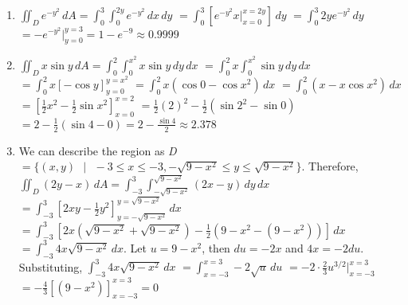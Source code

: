 \begin{Answer}[ref = non-rect]
\begin{enumerate}
    \item $\iint_{\textit{D}} e^{-y^2} \,dA = \int_0^3 \int_{0}^{2y} e^{-y^2}\,
    dx\,dy$ $= \int_0^3 \left[ e^{-y^2} x|_{x = 0}^{x = 2y} \right]\,dy$ $= 
    \int_0^3 2y e^{-y^2}\,dy$ $= -e^{-y^2}|_{y = 0}^{y = 3} = 1 - e^{-9} 
    \approx 0.9999$

    \item $\iint_{\textit{D}} x \sin{y}\,dA = \int_0^{2} \int_0^{x^2} x \sin{y}
    \,dy\,dx$ $= \int_0^{2} x \int_0^{x^2} \sin{y}\,dy\,dx$ $= \int_0^{2} x 
    \left[ -\cos{y} \right]_{y = 0}^{y = x^2}$ $= \int_0^{2} x \left( \cos{0} -
    \cos{x^2} \right)\,dx$ $= \int_0^{2} \left( x - x\cos{x^2} \right)\,dx$ $= 
    \left[ \frac{1}{2}x^2 - \frac{1}{2}\sin{x^2} \right]_{x = 0}^{x = 2}$ $= 
    \frac{1}{2}(2)^2 - \frac{1}{2} \left( \sin{2^2} - \sin{0} \right)$ $= 2 - 
    \frac{1}{2} \left( \sin{4} - 0 \right) = 2 - \frac{\sin{4}}{2} \approx 
    2.378$

    \item We can describe the region as \textit{D} $= \{ (x, y) \text{ } | 
    \text{ } -3 \leq x \leq -3, -\sqrt{9 - x^2} \leq y \leq \sqrt{9 - x^2} \}$.
    Therefore, $\iint_{\textit{D}} \left(2y - x \right)\,dA = \int_{-3}^3 
    \int_{-\sqrt{9 - x^2}}^{\sqrt{9 - x^2}} \left( 2x - y \right)\,dy\,dx$ $= 
    \int_{-3}^3 \left[ 2xy - \frac{1}{2}y^2 \right]_{y = -\sqrt{9 - x^2}}^{y = 
    \sqrt{9 - x^2}}\,dx$ $= \int_{-3}^3 \left[ 2x \left( \sqrt{9 - x^2} + 
    \sqrt{9 - x^2} \right) - \frac{1}{2} \left( 9 - x^2 - \left(9 - x^2 \right) 
    \right) \right]\,dx$ $= \int_{-3}^3 4x\sqrt{9 - x^2}\,dx$. Let $u = 9 - 
    x^2$, then $du = -2x$ and $4x = -2du$. Substituting, $\int_{-3}^3 4x\sqrt{
    9 - x^2}\,dx$ $= \int_{x = -3}^{x = 3} -2\sqrt{u}\,du$ $= -2 \cdot 
    \frac{2}{3} u^{3/2}|_{x = -3}^{x = 3}$ $= -\frac{4}{3} \left[ \left( 9 - 
    x^2 \right) \right]_{x = -3}^{x = 3} = 0$
\end{enumerate}
\end{Answer}